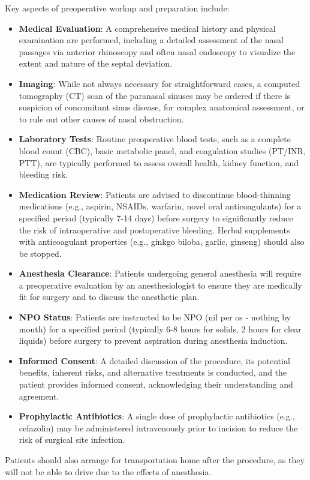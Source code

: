 Key aspects of preoperative workup and preparation include:
\begin{itemize}
  \item \textbf{Medical Evaluation}: A comprehensive medical history and physical examination are performed, including a detailed assessment of the nasal passages via anterior rhinoscopy and often nasal endoscopy to visualize the extent and nature of the septal deviation.
  \item \textbf{Imaging}: While not always necessary for straightforward cases, a computed tomography (CT) scan of the paranasal sinuses may be ordered if there is suspicion of concomitant sinus disease, for complex anatomical assessment, or to rule out other causes of nasal obstruction.
  \item \textbf{Laboratory Tests}: Routine preoperative blood tests, such as a complete blood count (CBC), basic metabolic panel, and coagulation studies (PT/INR, PTT), are typically performed to assess overall health, kidney function, and bleeding risk.
  \item \textbf{Medication Review}: Patients are advised to discontinue blood-thinning medications (e.g., aspirin, NSAIDs, warfarin, novel oral anticoagulants) for a specified period (typically 7-14 days) before surgery to significantly reduce the risk of intraoperative and postoperative bleeding. Herbal supplements with anticoagulant properties (e.g., ginkgo biloba, garlic, ginseng) should also be stopped.
  \item \textbf{Anesthesia Clearance}: Patients undergoing general anesthesia will require a preoperative evaluation by an anesthesiologist to ensure they are medically fit for surgery and to discuss the anesthetic plan.
  \item \textbf{NPO Status}: Patients are instructed to be NPO (nil per os - nothing by mouth) for a specified period (typically 6-8 hours for solids, 2 hours for clear liquids) before surgery to prevent aspiration during anesthesia induction.
  \item \textbf{Informed Consent}: A detailed discussion of the procedure, its potential benefits, inherent risks, and alternative treatments is conducted, and the patient provides informed consent, acknowledging their understanding and agreement.
  \item \textbf{Prophylactic Antibiotics}: A single dose of prophylactic antibiotics (e.g., cefazolin) may be administered intravenously prior to incision to reduce the risk of surgical site infection.
\end{itemize}
Patients should also arrange for transportation home after the procedure, as they will not be able to drive due to the effects of anesthesia.

